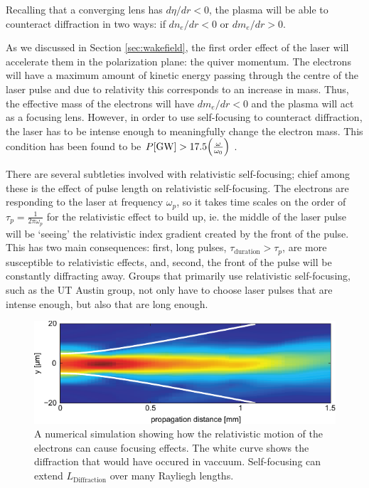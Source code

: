 \documentclass[12pt,letter]{article}
\begin{document}
Recalling that a converging lens has $d\eta/dr < 0$, the plasma
will be able to counteract diffraction in two ways: if $d
n_e/dr <0$ or $d m_e/dr >0$.

As we discussed in Section
\ref{sec:wakefield}, the first order effect of the laser will
accelerate them in the polarization plane: the quiver momentum. The electrons
will have a maximum amount of kinetic energy passing through the centre of
the laser pulse and due to relativity this corresponds to an
increase in mass. Thus, the effective mass of the electrons will have
$dm_e/dr<0$ and the plasma will act as a focusing lens.  However, in order to
use self-focusing to counteract diffraction,
the laser has to be intense enough to meaningfully change the electron mass.
This condition has been found to be $P[\si{\giga\watt}] > 17.5
\qty(\frac{\omega}{\omega_0})$ \cite{sprangle1987relativistic,sun1987self}.

There are several subtleties involved with relativistic self-focusing; chief among these is the effect
of pulse length on relativistic self-focusing. The electrons
are responding to the laser at frequency $\omega_p$, so it takes time scales on the order of $\tau_p
= \frac{1}{2\pi\omega_p}$ for the relativistic effect to build up, ie. the middle
    of the laser pulse will be `seeing' the relativistic index gradient created
    by the front of the pulse. This has two main consequences: first, long
    pulses, $\tau_\textrm{duration} > \tau_p$, are more susceptible to
    relativistic effects, and, second, the front of the pulse will be constantly
    diffracting away. Groups that primarily use relativistic self-focusing, such
    as the UT Austin group, not
    only have to choose laser pulses that are intense enough, but also that are long enough. 
    \begin{figure}[h!]
        \includegraphics[width=\textwidth]{../figures/relselffocus.pdf}
        \caption{\small A numerical simulation showing how the relativistic motion of the electrons can
            cause focusing effects\cite{genothesis}. The white curve shows the
            diffraction that would have occured in vaccuum. Self-focusing can
            extend $L_\textrm{Diffraction}$ over many Rayliegh lengths.
        }
    \end{figure}
\end{document}
